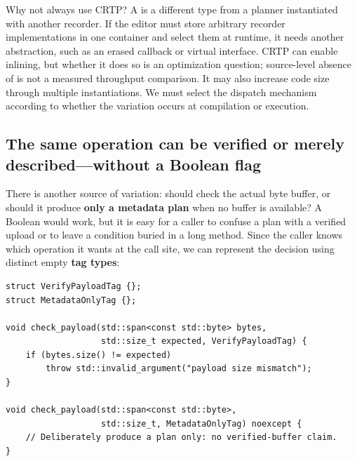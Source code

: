 Why not always use CRTP? A  is a different type from a planner instantiated with another recorder. If the editor must store arbitrary recorder implementations in one container and select them at runtime, it needs another abstraction, such as an erased callback or virtual interface. CRTP can enable inlining, but whether it does so is an optimization question; source-level absence of  is not a measured throughput comparison. It may also increase code size through multiple instantiations. We must select the dispatch mechanism according to whether the variation occurs at compilation or execution.

\subsection{The same operation can be verified or merely described---without a Boolean flag}\label{01-foundations-i-ch005-the-same-operation-can-be-verified-or-merely-describedwithout-a-boolean-flag}

\hypertarget{01-foundations-i-ch005-the-same-operation-can-be-verified-or-merely-describedwithout-a-boolean-flag}{}

There is another source of variation: should  check the actual byte buffer, or should it produce \textbf{only a metadata plan} when no buffer is available? A Boolean  would work, but it is easy for a caller to confuse a plan with a verified upload or to leave a condition buried in a long method. Since the caller knows which operation it wants at the call site, we can represent the decision using distinct empty \textbf{tag types}:

\begin{verbatim}
struct VerifyPayloadTag {};
struct MetadataOnlyTag {};

void check_payload(std::span<const std::byte> bytes,
                   std::size_t expected, VerifyPayloadTag) {
    if (bytes.size() != expected)
        throw std::invalid_argument("payload size mismatch");
}

void check_payload(std::span<const std::byte>,
                   std::size_t, MetadataOnlyTag) noexcept {
    // Deliberately produce a plan only: no verified-buffer claim.
}
\end{verbatim}

